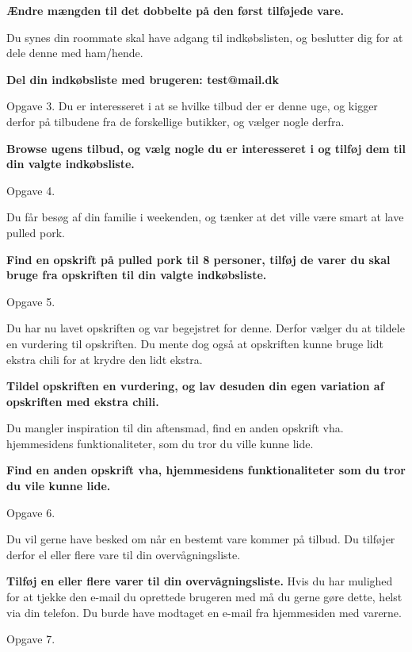 \textbf{Ændre mængden til det dobbelte på den først tilføjede vare.}

Du synes din roommate skal have adgang til indkøbslisten, og beslutter dig for at dele denne med ham/hende.

\textbf{Del din indkøbsliste med brugeren: test@mail.dk}

Opgave 3.
Du er interesseret i at se hvilke tilbud der er denne uge, og kigger derfor på tilbudene fra de forskellige butikker, og vælger nogle derfra.

\textbf{Browse ugens tilbud, og vælg nogle du er interesseret i og tilføj dem til din valgte indkøbsliste.}

Opgave 4.

Du får besøg af din familie i weekenden, og tænker at det ville være smart at lave pulled pork.

\textbf{Find en opskrift på pulled pork til 8 personer, tilføj de varer du skal bruge fra opskriften til din valgte indkøbsliste.}

Opgave 5.

Du har nu lavet opskriften og var begejstret for denne. Derfor vælger du at tildele en vurdering til opskriften.
Du mente dog også at opskriften kunne bruge lidt ekstra chili for at krydre den lidt ekstra.

\textbf{Tildel opskriften en vurdering, og lav desuden din egen variation af opskriften med ekstra chili.}

Du mangler inspiration til din aftensmad, find en anden opskrift vha. hjemmesidens funktionaliteter, som du tror du ville kunne lide.

\textbf{Find en anden opskrift vha, hjemmesidens funktionaliteter som du tror du vile kunne lide.}

Opgave 6.

Du vil gerne have besked om når en bestemt vare kommer på tilbud. Du tilføjer derfor el eller flere vare til din overvågningsliste.

\textbf{Tilføj en eller flere varer til din overvågningsliste.}
Hvis du har mulighed for at tjekke den e-mail du oprettede brugeren med må du gerne gøre dette, helst via din telefon. Du burde have modtaget en e-mail fra hjemmesiden med varerne.

Opgave 7.

